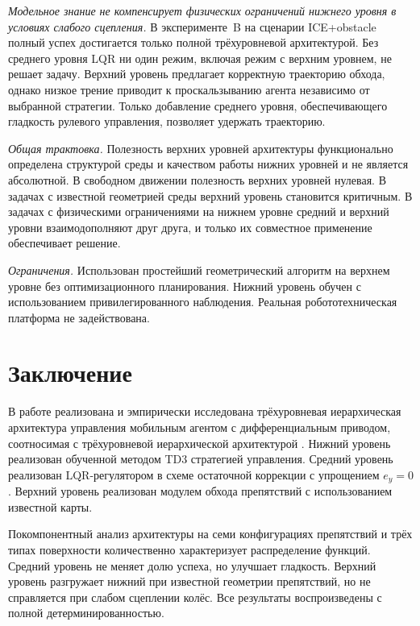 \documentclass[11pt]{article}
\begin{document}
\textit{Модельное знание не компенсирует физических ограничений нижнего уровня в условиях слабого сцепления.} В эксперименте~B на сценарии ICE+obstacle полный успех достигается только полной трёхуровневой архитектурой. Без среднего уровня LQR ни один режим, включая режим с верхним уровнем, не решает задачу. Верхний уровень предлагает корректную траекторию обхода, однако низкое трение приводит к проскальзыванию агента независимо от выбранной стратегии. Только добавление среднего уровня, обеспечивающего гладкость рулевого управления, позволяет удержать траекторию.

\textit{Общая трактовка.} Полезность верхних уровней архитектуры функционально определена структурой среды и качеством работы нижних уровней и не является абсолютной. В свободном движении полезность верхних уровней нулевая. В задачах с известной геометрией среды верхний уровень становится критичным. В задачах с физическими ограничениями на нижнем уровне средний и верхний уровни взаимодополняют друг друга, и только их совместное применение обеспечивает решение.

\textit{Ограничения.} Использован простейший геометрический алгоритм на верхнем уровне без оптимизационного планирования. Нижний уровень обучен с использованием привилегированного наблюдения. Реальная робототехническая платформа не задействована.

\section{Заключение}
\label{sec:conclusion}

В работе реализована и эмпирически исследована трёхуровневая иерархическая
архитектура управления мобильным агентом с дифференциальным приводом,
соотносимая с трёхуровневой иерархической архитектурой
\cite{kiselev2020dissertation,kiselev2020}. Нижний уровень реализован обученной методом TD3 стратегией управления. Средний уровень реализован LQR-регулятором в схеме остаточной коррекции с упрощением $e_y = 0$. Верхний уровень реализован модулем обхода препятствий с использованием известной карты.

Покомпонентный анализ архитектуры на семи конфигурациях препятствий и трёх типах поверхности количественно характеризует распределение функций.
Средний уровень не меняет долю успеха, но улучшает гладкость.
Верхний уровень разгружает нижний при известной геометрии препятствий,
но не справляется при слабом сцеплении колёс. Все результаты воспроизведены с полной детерминированностью.
\end{document}
